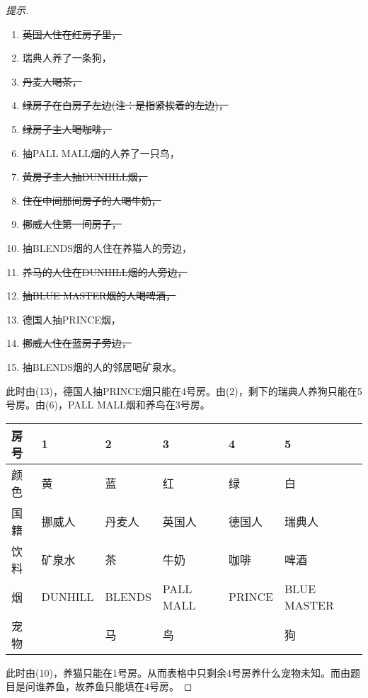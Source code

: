 \begin{proof}[提示]
    \begin{enumerate}
    \item \sout{英国人住在红房子里，}
    \item 瑞典人养了一条狗，
    \item \sout{丹麦人喝茶，}
    \item \sout{绿房子在白房子左边(注：是指紧挨着的左边)，}
    \item \sout{绿房子主人喝咖啡，}
    \item 抽PALL MALL烟的人养了一只鸟，
    \item \sout{黄房子主人抽DUNHILL烟，}
    \item \sout{住在中间那间房子的人喝牛奶，}
    \item \sout{挪威人住第一间房子，}
    \item 抽BLENDS烟的人住在养猫人的旁边，
    \item \sout{养马的人住在DUNHILL烟的人旁边，}
    \item \sout{抽BLUE MASTER烟的人喝啤酒，}
    \item 德国人抽PRINCE烟，
    \item \sout{挪威人住在蓝房子旁边，}
    \item 抽BLENDS烟的人的邻居喝矿泉水。
    \end{enumerate}

    此时由(13)，德国人抽PRINCE烟只能在4号房。由(2)，剩下的瑞典人养狗只能在5号房。由(6)，PALL MALL烟和养鸟在3号房。
    \begin{center}
      \renewcommand*{\arraystretch}{1.0}
      \begin{tabular}{l|l|l|l|l|l}
        \hline
        房号     & 1      & 2      & 3         & 4     & 5           \\\hline
        颜色     & 黄     & 蓝     & 红        & 绿    &白           \\\hline
        国籍     & 挪威人 & 丹麦人 & 英国人    & 德国人&瑞典人       \\\hline
        饮料     & 矿泉水 & 茶     & 牛奶      & 咖啡  &啤酒         \\\hline
        烟       & DUNHILL& BLENDS & PALL MALL & PRINCE&BLUE MASTER  \\\hline
        宠物     &        & 马     & 鸟        &       &狗           \\
        \hline
      \end{tabular}
    \end{center}

    此时由(10)，养猫只能在1号房。从而表格中只剩余4号房养什么宠物未知。而由题目是问谁养鱼，故养鱼只能填在4号房。
\end{proof}



